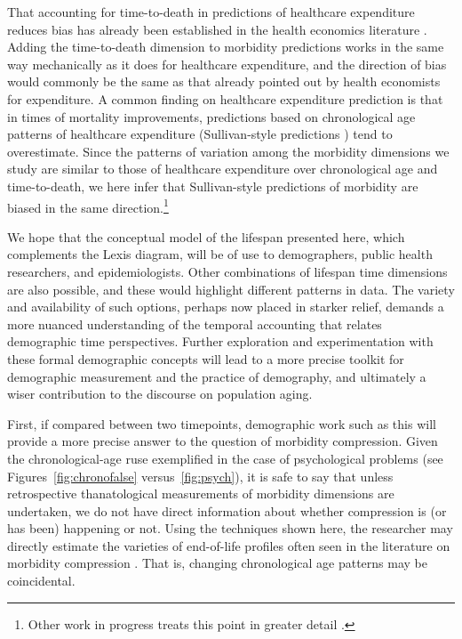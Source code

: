 \documentclass[11pt,oneside]{article} %
\begin{document}
That accounting for time-to-death in predictions of
healthcare expenditure reduces bias has already been established in the health
economics literature \citep[e.g.,][]{stearns2004time}. Adding the time-to-death
dimension to morbidity predictions works in the same way mechanically as it does for
healthcare expenditure, and the direction of bias would commonly be the same as
that already pointed out by health economists for expenditure. A common finding
on healthcare expenditure prediction is that in times of mortality improvements,
predictions based on chronological age patterns of healthcare
expenditure (Sullivan-style predictions \citep{sullivan1970}) tend
to overestimate.
Since the patterns of variation among the morbidity dimensions we study are
similar to those of healthcare expenditure over chronological age and
time-to-death, we here infer that Sullivan-style predictions of morbidity are
biased in the same direction.\footnote{Other work in progress treats this point
in greater detail \citep{vanRaalte2015HLE}.}

We hope that the conceptual model of the
lifespan presented here, which complements the Lexis diagram, will be of use to
demographers, public health researchers, and epidemiologists. Other combinations
of lifespan time dimensions are also possible, and these would highlight different patterns in data. The variety and
availability of such options, perhaps now placed in starker relief, demands a more nuanced
understanding of the temporal accounting that relates demographic time
perspectives. Further exploration and experimentation with these formal
demographic concepts will lead to a more precise toolkit for demographic
measurement and the practice of demography, and ultimately a wiser contribution
to the discourse on population aging.

First, if
compared between two timepoints, demographic work such as this will
provide a more precise answer to the question of morbidity compression. Given the chronological-age ruse exemplified in the case of psychological problems (see Figures~\ref{fig:chronofalse} versus~\ref{fig:psych}), it is safe to say that unless retrospective
thanatological measurements of morbidity dimensions are undertaken, we do
not have direct information about whether compression is (or has
been) happening or not. Using the techniques shown here, the researcher may
directly estimate the varieties of end-of-life profiles often seen in the
literature on morbidity compression \citep[e.g.,][]{fries2011compression}.
That is, changing chronological age patterns may be coincidental.
\end{document}
